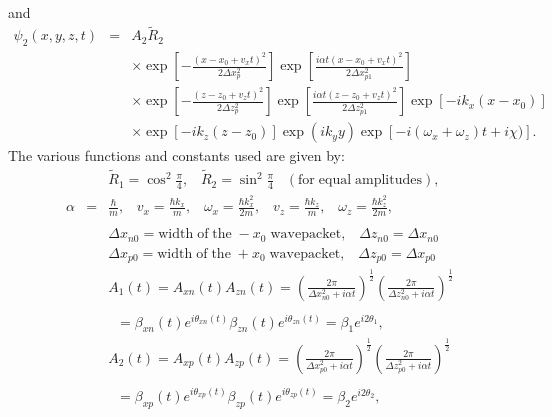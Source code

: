 \documentclass[12pt]{article}       %
\begin{document}
\newpage
\mbox{}\\
and
\begin{eqnarray}
\psi_2(x,y,z,t)&=&A_2\tilde{R}_{2}\nonumber\\
&&\times\exp\left[{-  \frac{(x-x_0+v_x t)^2}{2\Delta x_p^2}}\right]\exp\left[{\frac{i\alpha t(x-x_0+v_x t)^2}{2\Delta x_{p1}^2}}\right]\nonumber\\
&&\times\exp\left[{-  \frac{(z-z_0+v_z t)^2}{2\Delta z_p^2}}\right] \exp\left[{\frac{i\alpha t(z-z_0+v_z t)^2}{2\Delta z_{p1}^2}}\right]\exp\left[-ik_x(x-x_0)\right]\nonumber\\
&&\times\exp\left[-ik_z(z-z_0)\right]\exp\left(ik_yy\right)\exp\left[-i(\omega_x+\omega_z) t+i\chi)\right].\label{psi2}
\end{eqnarray}
The various functions and constants used are given by:
\begin{eqnarray}
&&\!\!\!\!\!\!\!\!\!\!\!\!\!\tilde{R}_{1}=\cos^2\frac{\pi}{4},\;\;\;\tilde{R}_{2}=\sin^2\frac{\pi}{4}\;\;\;\mathrm{(for\; equal\; amplitudes)},\nonumber\\
\alpha&=&\frac{\hbar}{m},\; \;\;v_x=\frac{\hbar k_x}{m}, \;\;\;\omega_x=\frac{\hbar k_x^2}{2m},\;\;\;v_z=\frac{\hbar k_z}{m}, \;\;\;\omega_z=\frac{\hbar k_z^2}{2m},\nonumber\\     \nonumber\\
&&\!\!\!\!\!\!\!\!\!\!\!\!\!\Delta x_{n0}=\mathrm{width \;of\; the}\;-x_0\;\mathrm{wavepacket}, \;\;\;\Delta z_{n0}=\Delta x_{n0}\nonumber\\
&&\!\!\!\!\!\!\!\!\!\!\!\!\!\Delta x_{p0}=\mathrm{width \;of\; the}\;+x_0\;\mathrm{wavepacket}, \;\;\;\Delta z_{p0}=\Delta x_{p0}\nonumber\\
&&\!\!\!\!\!\!\!\!\!\!\!\!\!A_1(t)=A_{xn}(t)A_{zn}(t)= \left(    \frac{2\pi}{\Delta x_{n0}^2+i\alpha t}   \right)^{\frac{1}{2}}\left(\frac{2\pi}{\Delta z_{n0}^2+i\alpha t}\right)^{\frac{1}{2}} \nonumber \\ \nonumber\\
&&\;\;=\beta_{xn} (t)e^{i\theta_{xn}(t)}\beta_{zn}(t)e^{i\theta_{zn}(t)}=\beta_1e^{ i2\theta_1}, \label{AA11}\\
&&\!\!\!\!\!\!\!\!\!\!\!\!\!A_2(t)=A_{xp}(t)A_{zp}(t)= \left(    \frac{2\pi}{\Delta x_{p0}^2+i\alpha t}   \right)^{\frac{1}{2}}\left(\frac{2\pi}{\Delta z_{p0}^2+i\alpha t}\right)^{\frac{1}{2}}  \nonumber\\ \nonumber\\
&&\;\;=\beta_{xp} (t)e^{i\theta_{xp}(t)}\beta_{zp}(t)e^{i\theta_{zp}(t)}=\beta_2 e^{ i2\theta_2}, \label{AA22}
\end{eqnarray}
\end{document}
